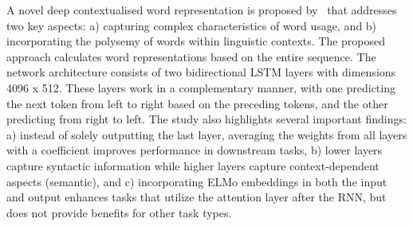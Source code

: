 A novel deep contextualised word representation is proposed by~\cite{peters2018deep} that addresses two key aspects: a) capturing complex characteristics of word usage, and b) incorporating the polysemy of words within linguistic contexts. The proposed approach calculates word representations based on the entire sequence. The network architecture consists of two bidirectional LSTM layers with dimensions 4096 x 512. These layers work in a complementary manner, with one predicting the next token from left to right based on the preceding tokens, and the other predicting from right to left. The study also highlights several important findings: a) instead of solely outputting the last layer, averaging the weights from all layers with a coefficient improves performance in downstream tasks, b) lower layers capture syntactic information while higher layers capture context-dependent aspects (semantic), and c) incorporating ELMo embeddings in both the input and output enhances tasks that utilize the attention layer after the RNN, but does not provide benefits for other task types.

